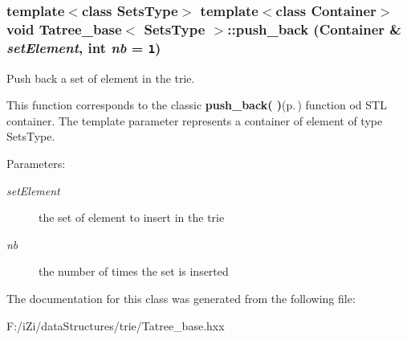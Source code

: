 \subsubsection{\setlength{\rightskip}{0pt plus 5cm}template$<$class Sets\-Type$>$ template$<$class Container$>$ void {\bf Tatree\_\-base}$<$ Sets\-Type $>$::push\_\-back (Container \& {\em set\-Element}, int {\em nb} = {\tt 1})\hspace{0.3cm}{\tt  [inline]}}\label{class_tatree__base_66e0c0d2fa534d9cf53a9b5fe732eb79}


Push back a set of element in the trie. 

This function corresponds to the classic {\bf push\_\-back( )}{\rm (p.\,\pageref{class_tatree__base_66e0c0d2fa534d9cf53a9b5fe732eb79})} function od STL container. The template parameter represents a container of element of type Sets\-Type. \begin{Desc}
\item[Parameters:]
\begin{description}
\item[{\em set\-Element}]the set of element to insert in the trie \item[{\em nb}]the number of times the set is inserted \end{description}
\end{Desc}


The documentation for this class was generated from the following file:\begin{CompactItemize}
\item 
F:/i\-Zi/data\-Structures/trie/Tatree\_\-base.hxx\end{CompactItemize}
